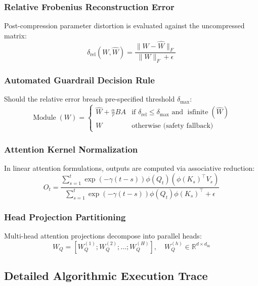 \subsubsection{Relative Frobenius Reconstruction Error}
Post-compression parameter distortion is evaluated against the uncompressed matrix:
\[
\delta_{\text{rel}}(W, \hat{W}) = \frac{\|W - \hat{W}\|_F}{\|W\|_F + \epsilon}
\]

\subsubsection{Automated Guardrail Decision Rule}
Should the relative error breach pre-specified threshold $\delta_{\text{max}}$:
\[
\operatorname{Module}(W) = \begin{cases} \hat{W} + \frac{\alpha}{r} B A & \text{if } \delta_{\text{rel}} \le \delta_{\text{max}} \text{ and } \operatorname{isfinite}(\hat{W}) \\ W & \text{otherwise (safety fallback)} \end{cases}
\]

\subsubsection{Attention Kernel Normalization}
In linear attention formulations, outputs are computed via associative reduction:
\[
O_t = \frac{\sum_{s=1}^{t} \exp(-\gamma (t-s)) \phi(Q_t) (\phi(K_s)^\top V_s)}{\sum_{s=1}^{t} \exp(-\gamma (t-s)) \phi(Q_t) \phi(K_s)^\top + \epsilon}
\]

\subsubsection{Head Projection Partitioning}
Multi-head attention projections decompose into parallel heads:
\[
W_Q = [W_Q^{(1)}; W_Q^{(2)}; \dots; W_Q^{(H)}], \quad W_Q^{(h)} \in \mathbb{R}^{d \times d_{\text{in}}}
\]

\subsection{Detailed Algorithmic Execution Trace}

